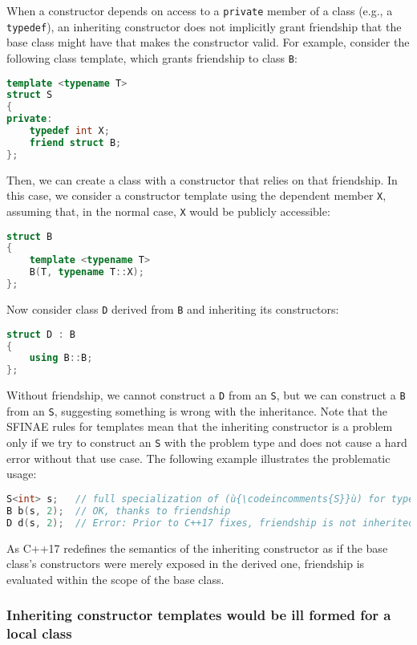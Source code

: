 When a constructor depends on access to a \texttt{private} member of a class (e.g., a \texttt{typedef}), an inheriting constructor does not implicitly grant friendship that the base class might have that makes the constructor valid. For example, consider the following class template, which grants friendship to class \texttt{B}:
\begin{lstlisting}[language=C++]
template <typename T>
struct S
{
private:
    typedef int X;
    friend struct B;
};
\end{lstlisting}
    Then, we can create a class with a constructor that relies on that friendship. In this case, we consider a constructor template using the dependent member \texttt{X}, assuming that, in the normal case, \texttt{X} would be publicly accessible:
\begin{lstlisting}[language=C++]
struct B
{
    template <typename T>
    B(T, typename T::X);
};
\end{lstlisting}
    Now consider class \texttt{D} derived from \texttt{B} and inheriting its constructors:
\begin{lstlisting}[language=C++]
struct D : B
{
    using B::B;
};
\end{lstlisting}
    Without friendship, we cannot construct a \texttt{D} from an \texttt{S}, but we can construct a \texttt{B} from an \texttt{S}, suggesting something is wrong with the inheritance. Note that the SFINAE rules for templates mean that the inheriting constructor is a problem only if we try to construct an \texttt{S} with the problem type and does not cause a hard error without that use case. The following example illustrates the problematic usage:
\begin{lstlisting}[language=C++]
S<int> s;   // full specialization of (ù{\codeincomments{S}}ù) for type (ù{\codeincomments{int}}ù)
B b(s, 2);  // OK, thanks to friendship
D d(s, 2);  // Error: Prior to C++17 fixes, friendship is not inherited.
\end{lstlisting}
    As C++17 redefines the semantics of the inheriting constructor as if the base class’s constructors were merely exposed in the derived one, friendship is evaluated within the scope of the base class.

\subsubsection[Inheriting constructor templates would be ill formed for a local class]{Inheriting constructor templates would be ill formed for a local class}

